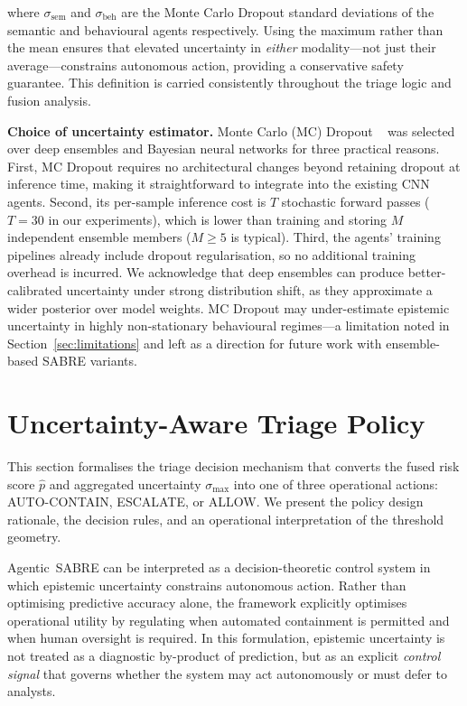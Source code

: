 \documentclass[lettersize,journal]{IEEEtran}
\begin{document}
\cbstart
where $\sigma_{\text{sem}}$ and $\sigma_{\text{beh}}$ are the Monte Carlo Dropout standard
deviations of the semantic and behavioural agents respectively. Using the maximum rather than
the mean ensures that elevated uncertainty in \emph{either} modality---not just their
average---constrains autonomous action, providing a conservative safety guarantee.
This definition is carried consistently throughout the triage logic and fusion analysis.
\cbend



\cbstart
\noindent\textbf{Choice of uncertainty estimator.}
Monte Carlo (MC) Dropout
\cbend
~\cite{gal2016dropout} was selected over deep ensembles and Bayesian
neural networks for three practical reasons. First, MC Dropout requires no architectural
changes beyond retaining dropout at inference time, making it straightforward to integrate
into the existing CNN agents. Second, its per-sample inference cost is $T$ stochastic forward
passes ($T = 30$ in our experiments), which is lower than training and storing $M$ independent
ensemble members ($M \ge 5$ is typical). Third, the agents' training pipelines already include
dropout regularisation, so no additional training overhead is incurred. We acknowledge that
deep ensembles can produce better-calibrated uncertainty under strong distribution shift,
as they approximate a wider posterior over model weights. 
\cbstart
MC Dropout may under-estimate
epistemic uncertainty in highly non-stationary behavioural regimes---a limitation noted in
Section~\ref{sec:limitations} and left as a direction for future work with ensemble-based
SABRE variants.
\cbend



\section{Uncertainty-Aware Triage Policy}
\label{sec:uncert_policy}


\cbstart
This section formalises the triage decision mechanism that converts the fused risk score
$\hat{p}$ and aggregated uncertainty $\sigma_{\max}$ into one of three operational actions:
\textsc{AUTO-CONTAIN}, \textsc{ESCALATE}, or \textsc{ALLOW}. We present the policy design
rationale, the decision rules, and an operational interpretation of the threshold geometry.
\cbend


Agentic~SABRE can be interpreted as a decision-theoretic control system in which
epistemic uncertainty constrains autonomous action. Rather than optimising
predictive accuracy alone, the framework explicitly optimises operational utility
by regulating when automated containment is permitted and when human oversight
is required. In this formulation, epistemic uncertainty is not treated as a
diagnostic by-product of prediction, but as an explicit \emph{control signal}
that governs whether the system may act autonomously or must defer to analysts.
\end{document}
